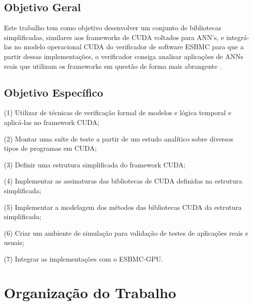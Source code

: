 \subsection{Objetivo Geral}
Este trabalho tem como objetivo desenvolver um conjunto de bibliotecas simplificadas, similares aos frameworks de CUDA voltados para ANN's, e integrá-las no modelo operacional CUDA do verificador de software ESBMC para que a partir dessas implementações, o verificador consiga analisar aplicações de ANNs reais que utilizam os frameworks em questão de forma mais abrangente .

\subsection{Objetivo Específico}
(1)	Utilizar de técnicas de verificação formal de modelos e lógica temporal e aplicá-las no framework CUDA; 

(2)	Montar uma suíte de teste a partir de um estudo analítico sobre diversos tipos de programas em CUDA;

(3)	Definir uma estrutura simplificada do framework CUDA; 

(4)	Implementar as assinaturas das bibliotecas de CUDA definidas na estrutura simplificada;

(5)	Implementar a modelagem dos métodos das bibliotecas CUDA da estrutura simplificada;

(6)	Criar um ambiente de simulação para validação de testes de aplicações reais e usuais;

(7)	Integrar as implementações com o ESBMC-GPU.

\section{Organização do Trabalho}


